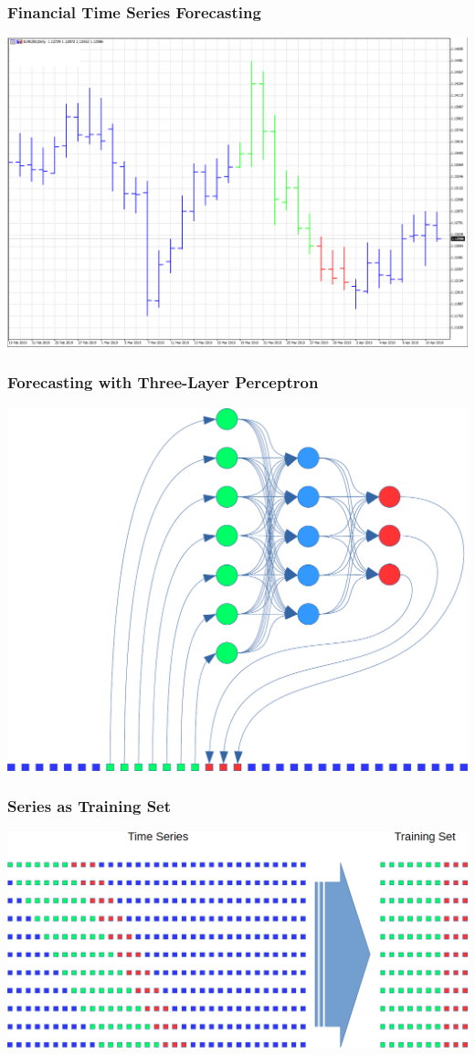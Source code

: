 \documentclass{beamer}
\begin{document}
\begin{frame}
\frametitle{Financial Time Series Forecasting}
\includegraphics[scale=0.2]{fig01}
\end{frame}

\begin{frame}
\frametitle{Forecasting with Three-Layer Perceptron}
\includegraphics[scale=0.2]{fig02}
\end{frame}

\begin{frame}
\frametitle{Series as Training Set}
\includegraphics[scale=0.25]{fig03}
\end{frame}
\end{document}
